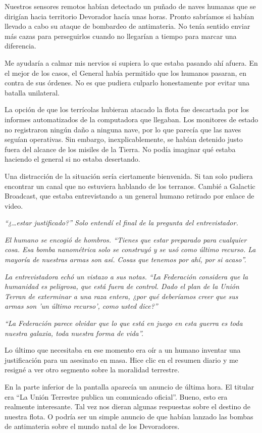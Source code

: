 Nuestros sensores remotos habían detectado un puñado de naves humanas que se dirigían hacia territorio Devorador hacía unas horas. Pronto sabríamos si habían llevado a cabo su ataque de bombardeo de antimateria. No tenía sentido enviar más cazas para perseguirlos cuando no llegarían a tiempo para marcar una diferencia.

Me ayudaría a calmar mis nervios si supiera lo que estaba pasando ahí afuera. En el mejor de los casos, el General había permitido que los humanos pasaran, en contra de sus órdenes. No es que pudiera culparlo honestamente por evitar una batalla unilateral.

La opción de que los terrícolas hubieran atacado la flota fue descartada por los informes automatizados de la computadora que llegaban. Los monitores de estado no registraron ningún daño a ninguna nave, por lo que parecía que las naves seguían operativas. Sin embargo, inexplicablemente, se habían detenido justo fuera del alcance de los misiles de la Tierra. No podía imaginar qué estaba haciendo el general si no estaba desertando.

Una distracción de la situación sería ciertamente bienvenida. Si tan solo pudiera encontrar un canal que no estuviera hablando de los terranos. Cambié a Galactic Broadcast, que estaba entrevistando a un general humano retirado por enlace de video.

\textit{“¿…estar justificado?” Solo entendí el final de la pregunta del entrevistador.}

\textit{El humano se encogió de hombros. “Tienes que estar preparado para cualquier cosa. Esa bomba nanométrica solo se construyó y se usó como último recurso. La mayoría de nuestras armas son así. Cosas que tenemos por ahí, por si acaso”.}

\textit{La entrevistadora echó un vistazo a sus notas. “La Federación considera que la humanidad es peligrosa, que está fuera de control. Dado el plan de la Unión Terran de exterminar a una raza entera, ¿por qué deberíamos creer que sus armas son 'un último recurso', como usted dice?”}

\textit{“La Federación parece olvidar que lo que está en juego en esta guerra es toda nuestra galaxia, toda nuestra forma de vida”.}

Lo último que necesitaba en ese momento era oír a un humano inventar una justificación para un asesinato en masa. Hice clic en el resumen diario y me resigné a ver otro segmento sobre la moralidad terrestre.

En la parte inferior de la pantalla aparecía un anuncio de última hora. El titular era “La Unión Terrestre publica un comunicado oficial”. Bueno, esto era realmente interesante. Tal vez nos dieran algunas respuestas sobre el destino de nuestra flota. O podría ser un simple anuncio de que habían lanzado las bombas de antimateria sobre el mundo natal de los Devoradores.

